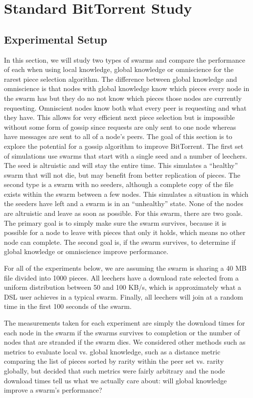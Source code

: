 \section{Standard BitTorrent Study}

\subsection{Experimental Setup}

In this section, we will study two types of swarms and compare the
performance of each when using local knowledge, global knowledge or 
omniscience for the rarest piece selection algorithm. The difference
between global knowledge and omniscience is that nodes with global
knowledge know which pieces every node in the swarm has but they do
no not know which pieces those nodes are currently
requesting. Omniscient nodes know both what every peer is requesting
and what they have. This allows for very efficient next piece
selection but is impossible without some form of gossip since requests
are only sent to one node whereas have messages are sent to all of a
node's peers. The goal of this section is to explore the potential for
a gossip algorithm to improve BitTorrent. The first set of simulations
use swarms that start with a single seed and a number of leechers.
The seed is altruistic and will stay the entire time. This 
simulates a ``healthy'' swarm that will not die, but may benefit from 
better replication of pieces. The second type is a swarm with no seeders, 
although a complete copy of the file exists within the swarm between a
few nodes. This simulates a situation in which the seeders have left
and a swarm is in an ``unhealthy'' state. None of the nodes are
altruistic and leave as soon as possible. For this swarm,
there are two goals. The primary goal is to simply make sure the swarm
survives, because it is possible for a node to leave with pieces that
only it holds, which means no other node can complete. The second goal
is, if the swarm survives, to determine if global knowledge or omniscience improve 
performance.

For all of the experiments below, we are assuming the swarm is sharing a
40 MB file divided into 1000 pieces. All leechers have a download rate
selected from a uniform distribution between 50 and 100 KB/s, which is
approximately what a DSL user achieves in a typical swarm. Finally, all
leechers will join at a random time in the first 100 seconds of the swarm.

The measurements taken for each experiment are simply the download times for
each node in the swarm if the swarms survives to completion or the
number of nodes that are stranded if the swarm dies. We considered
other methods such as metrics to evaluate local vs. global knowledge,
such as a distance metric comparing the list of pieces sorted by
rarity within the peer set vs. rarity globally, but decided that such
metrics were fairly arbitrary and the node download times tell us
what we actually care about: will global knowledge improve a swarm's
performance?

